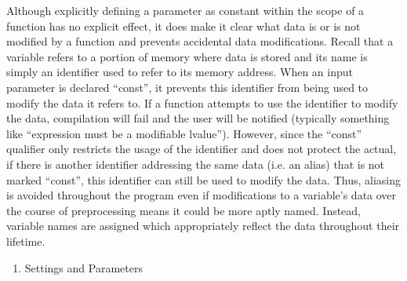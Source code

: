 \documentclass{article}
\begin{document}
Although explicitly defining a parameter as constant within the scope of a function has no explicit effect, it does make it clear what data is or is not modified by a function and prevents accidental data modifications.  Recall that a variable refers to a portion of memory where data is stored and its name is simply an identifier used to refer to its memory address.  When an input parameter is declared ``const'', it prevents this identifier from being used to modify the data it refers to.  If a function attempts to use the identifier to modify the data, compilation will fail and the user will be notified (typically something like ``expression must be a modifiable lvalue'').  However, since the ``const'' qualifier only restricts the usage of the identifier and does not protect the actual, if there is another identifier addressing the same data (i.e. an alias) that is not marked ``const'', this identifier can still be used to modify the data.  Thus, aliasing is avoided throughout the program even if modifications to a variable's data over the course of preprocessing means it could be more aptly named.  Instead, variable names are assigned which appropriately reflect the data throughout their lifetime.
\begin{enumerate}[label = (\arabic*), leftmargin = 0.0cm, resume = section]
\bfseries
\item Settings and Parameters
\end{enumerate}
\end{document}
